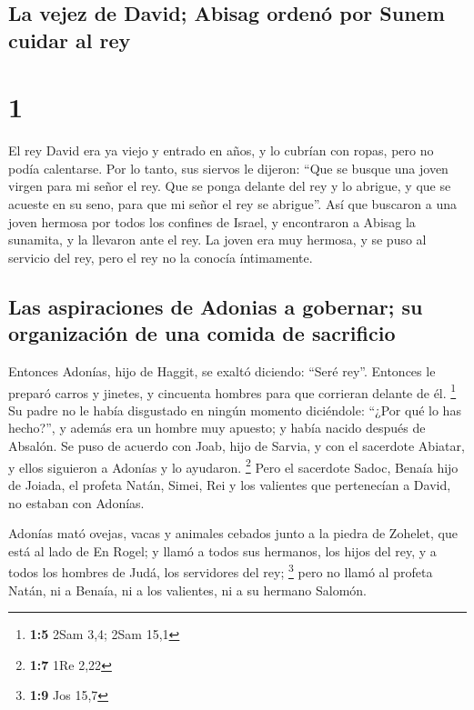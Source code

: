 \hypertarget{la-vejez-de-david-abisag-ordenuxf3-por-sunem-cuidar-al-rey}{%
\subsection{La vejez de David; Abisag ordenó por Sunem cuidar al
rey}\label{la-vejez-de-david-abisag-ordenuxf3-por-sunem-cuidar-al-rey}}

\hypertarget{section}{%
\section{1}\label{section}}

 El rey David era ya viejo y entrado en años, y lo cubrían
con ropas, pero no podía calentarse.  Por lo tanto, sus
siervos le dijeron: ``Que se busque una joven virgen para mi señor el
rey. Que se ponga delante del rey y lo abrigue, y que se acueste en su
seno, para que mi señor el rey se abrigue''.  Así que
buscaron a una joven hermosa por todos los confines de Israel, y
encontraron a Abisag la sunamita, y la llevaron ante el rey.
 La joven era muy hermosa, y se puso al servicio del rey,
pero el rey no la conocía íntimamente.

\hypertarget{las-aspiraciones-de-adonias-a-gobernar-su-organizaciuxf3n-de-una-comida-de-sacrificio}{%
\subsection{Las aspiraciones de Adonias a gobernar; su organización de
una comida de
sacrificio}\label{las-aspiraciones-de-adonias-a-gobernar-su-organizaciuxf3n-de-una-comida-de-sacrificio}}

 Entonces Adonías, hijo de Haggit, se exaltó diciendo:
``Seré rey''. Entonces le preparó carros y jinetes, y cincuenta hombres
para que corrieran delante de él. \footnote{\textbf{1:5} 2Sam 3,4; 2Sam
  15,1}  Su padre no le había disgustado en ningún momento
diciéndole: ``¿Por qué lo has hecho?'', y además era un hombre muy
apuesto; y había nacido después de Absalón.  Se puso de
acuerdo con Joab, hijo de Sarvia, y con el sacerdote Abiatar, y ellos
siguieron a Adonías y lo ayudaron. \footnote{\textbf{1:7} 1Re 2,22}
 Pero el sacerdote Sadoc, Benaía hijo de Joiada, el
profeta Natán, Simei, Rei y los valientes que pertenecían a David, no
estaban con Adonías.

 Adonías mató ovejas, vacas y animales cebados junto a la
piedra de Zohelet, que está al lado de En Rogel; y llamó a todos sus
hermanos, los hijos del rey, y a todos los hombres de Judá, los
servidores del rey; \footnote{\textbf{1:9} Jos 15,7} 
pero no llamó al profeta Natán, ni a Benaía, ni a los valientes, ni a su
hermano Salomón.

